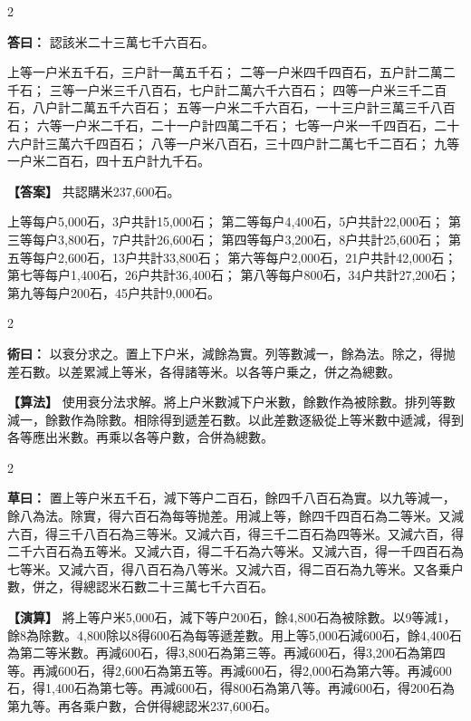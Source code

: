 \documentclass[11pt,a4paper]{article}
\newcommand{\ClassicalAnswer}[1]{\par\noindent\textbf{\color{answercolor}答曰：}#1\par}
\newcommand{\ClassicalMethod}[1]{\par\noindent\textbf{\color{methodcolor}術曰：}#1\par}
\newcommand{\ClassicalWorking}[1]{\par\noindent\textbf{草曰：}#1\par}
\newcommand{\ModernAnswer}[1]{\par\noindent\textbf{\color{answercolor}【答案】}#1\par}
\newcommand{\ModernMethod}[1]{\par\noindent\textbf{\color{methodcolor}【算法】}#1\par}
\newcommand{\ModernWorking}[1]{\par\noindent\textbf{【演算】}#1\par}
\begin{document}
\begin{paracol}{2}

\ClassicalAnswer{%
認該米二十三萬七千六百石。

上等一户米五千石，三户計一萬五千石；
二等一户米四千四百石，五户計二萬二千石；
三等一户米三千八百石，七户計二萬六千六百石；
四等一户米三千二百石，八户計二萬五千六百石；
五等一户米二千六百石，一十三户計三萬三千八百石；
六等一户米二千石，二十一户計四萬二千石；
七等一户米一千四百石，二十六户計三萬六千四百石；
八等一户米八百石，三十四户計二萬七千二百石；
九等一户米二百石，四十五户計九千石。}

\switchcolumn

\ModernAnswer{%
共認購米237,600石。

上等每户5,000石，3户共計15,000石；
第二等每户4,400石，5户共計22,000石；
第三等每户3,800石，7户共計26,600石；
第四等每户3,200石，8户共計25,600石；
第五等每户2,600石，13户共計33,800石；
第六等每户2,000石，21户共計42,000石；
第七等每户1,400石，26户共計36,400石；
第八等每户800石，34户共計27,200石；
第九等每户200石，45户共計9,000石。
}

\end{paracol}

\begin{paracol}{2}

\ClassicalMethod{%
以衰分求之。置上下户米，減餘為實。列等數減一，餘為法。除之，得抛差石數。以差累減上等米，各得諸等米。以各等户乗之，併之為總數。}

\switchcolumn

\ModernMethod{%
使用衰分法求解。將上户米數減下户米數，餘數作為被除數。排列等數減一，餘數作為除數。相除得到遞差石數。以此差數逐級從上等米數中遞減，得到各等應出米數。再乘以各等户數，合併為總數。
}

\end{paracol}

\begin{paracol}{2}

\ClassicalWorking{%
置上等户米五千石，減下等户二百石，餘四千八百石為實。以九等減一，餘八為法。除實，得六百石為每等抛差。用減上等，餘四千四百石為二等米。又減六百，得三千八百石為三等米。又減六百，得三千二百石為四等米。又減六百，得二千六百石為五等米。又減六百，得二千石為六等米。又減六百，得一千四百石為七等米。又減六百，得八百石為八等米。又減六百，得二百石為九等米。又各乗户數，併之，得總認米石數二十三萬七千六百石。}

\switchcolumn

\ModernWorking{%
將上等户米5,000石，減下等户200石，餘4,800石為被除數。以9等減1，餘8為除數。4,800除以8得600石為每等遞差數。用上等5,000石減600石，餘4,400石為第二等米數。再減600石，得3,800石為第三等。再減600石，得3,200石為第四等。再減600石，得2,600石為第五等。再減600石，得2,000石為第六等。再減600石，得1,400石為第七等。再減600石，得800石為第八等。再減600石，得200石為第九等。再各乘户數，合併得總認米237,600石。
}

\end{paracol}
\end{document}
